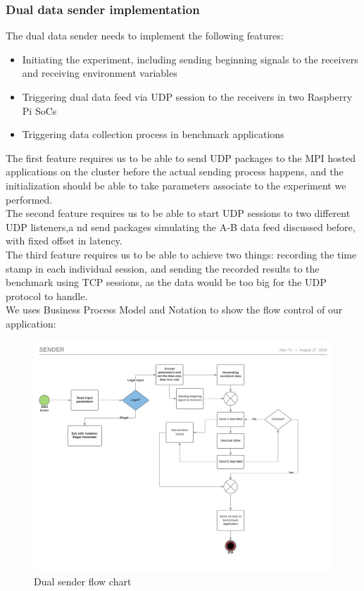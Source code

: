 \documentclass[11pt,openright,a4paper]{report}
\begin{document}
\subsubsection{Dual data sender implementation}
The dual data sender needs to implement the following features:
\begin{itemize}
	\item Initiating the experiment, including sending beginning signals to the receivers and receiving environment variables
	\item Triggering dual data feed via UDP session to the receivers in two Raspberry Pi SoCs
	\item Triggering data collection process in benchmark applications
\end{itemize}
The first feature requires us to be able to send UDP packages to the MPI hosted applications on the cluster before the actual sending process happens, and the initialization should be able to take parameters associate to the experiment we performed. \\
The second feature requires us to be able to start UDP sessions to two different UDP listeners,a nd send packages simulating the A-B data feed discussed before, with fixed offset in latency.\\
The third feature requires us to be able to achieve two things: recording the time stamp in each individual session, and sending the recorded results to the benchmark using TCP sessions, as the data would be too big for the UDP protocol to handle.\\
We uses Business Process Model and Notation to show the flow control of our application\cite{dijkman2011business}:
\begin{figure}[H]
\centering
\includegraphics[width=1.0\linewidth]{picture/senderDesign}
\caption{Dual sender flow chart}
\label{fig:senderDesign}
\end{figure}
\end{document}

